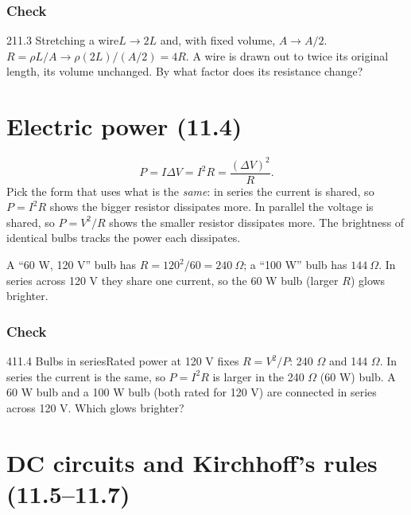 \documentclass[11pt]{article}
\begin{document}
\subsubsection{Check}\mbox{}

\begin{q}{2}{11.3 Stretching a wire}{$L \to 2L$ and, with fixed volume, $A \to A/2$. $R = \rho L/A \to \rho(2L)/(A/2) = 4R$.}
A wire is drawn out to twice its original length, its volume unchanged. By what factor does its resistance change?
\end{q}

\section{Electric power (11.4)}\label{sec:2}

\[ P = I\Delta V = I^2R = \frac{(\Delta V)^2}{R}. \]
Pick the form that uses what is the \emph{same}: in series the current is shared, so $P = I^2R$ shows the bigger resistor dissipates more. In parallel the voltage is shared, so $P = V^2/R$ shows the smaller resistor dissipates more. The brightness of identical bulbs tracks the power each dissipates.
\begin{example}
A ``60 W, 120 V'' bulb has $R = 120^2/60 = 240\ \Omega$; a ``100 W'' bulb has $144\ \Omega$. In series across 120 V they share one current, so the 60 W bulb (larger $R$) glows brighter.
\end{example}

\subsubsection{Check}\mbox{}

\begin{q}{4}{11.4 Bulbs in series}{Rated power at 120 V fixes $R = V^2/P$: 240 $\Omega$ and 144 $\Omega$. In series the current is the same, so $P = I^2R$ is larger in the 240 $\Omega$ (60 W) bulb.}
A 60 W bulb and a 100 W bulb (both rated for 120 V) are connected in series across 120 V. Which glows brighter?
\end{q}

\section{DC circuits and Kirchhoff's rules (11.5--11.7)}\label{sec:3}
\end{document}
